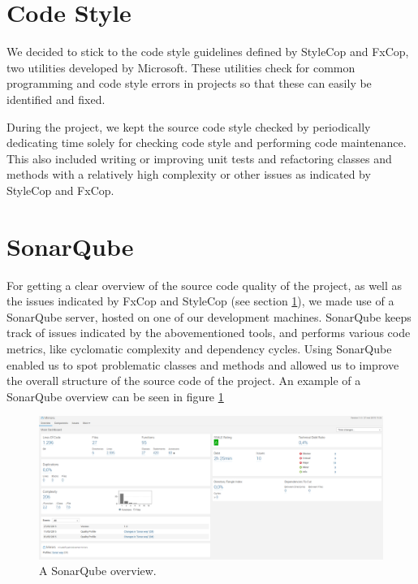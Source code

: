 	\section{Code Style} \label{sec:codestyle}
		We decided to stick to the code style guidelines defined by StyleCop and 
		FxCop, two utilities developed by Microsoft. These utilities check for 
		common programming and code style errors in projects so that these can 
		easily be identified and fixed. 
		
		During the project, we kept the source code style checked by periodically
		dedicating time solely for checking code style and performing code 
		maintenance. This also included writing or improving unit tests and 
		refactoring classes and methods with a relatively high complexity or other 
		issues as indicated by StyleCop and FxCop.
		
	\section{SonarQube} \label{sec:sonarqube}
		For getting a clear overview of the source code quality of the project, as 
		well as the issues indicated by FxCop and StyleCop (see section 
		\ref{sec:codestyle}), we made use of a SonarQube server, hosted on one of 
		our development machines. SonarQube keeps track of issues indicated by 
		the abovementioned tools, and performs various code metrics, like cyclomatic 
		complexity and dependency cycles. Using SonarQube enabled us to spot 
		problematic classes and methods and allowed us to improve the overall 
		structure of the source code of the project. An example of a SonarQube
		overview can be seen in figure \ref{fig:sonarqube}
		
		\begin{figure}[!ht]
			\centering
			\includegraphics[width=\textwidth]{SonarQube}
			\caption{A SonarQube overview.}
			\label{fig:sonarqube}
		\end{figure}
		
